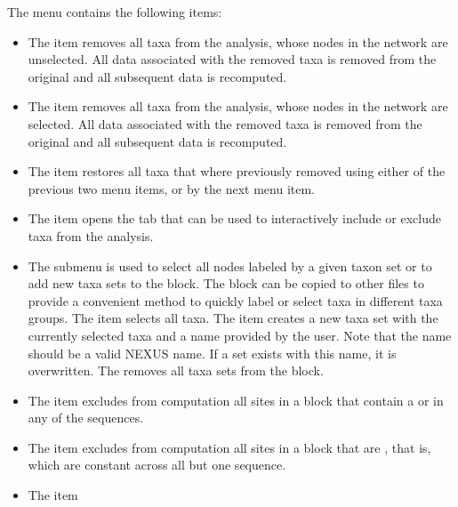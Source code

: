 \documentclass[11pt]{article}
\begin{document}

The  menu contains the following items:
\begin{itemize}
\item The  item
removes all taxa from the analysis, whose nodes in the network are
unselected.
All data associated with the removed taxa is removed
from the original  and all subsequent data is
recomputed.
\item The  item
removes all taxa from the analysis, whose nodes in the network are
selected.
All data associated with the removed taxa is removed
from the original  and all subsequent data is
recomputed.
\item The  item
restores all taxa that where previously removed using either of
the previous two menu items, or by the next menu item.
\item The  item
opens the  tab that can be used to interactively
include or exclude taxa from the analysis.
\item The  submenu is used to select all nodes
labeled by a given taxon set or to add new taxa sets to the  block. The  block can be copied to other files to provide a convenient method to quickly label or select taxa in different taxa groups.
The  item selects all taxa.
The  item creates a new taxa set with the currently selected taxa and a name provided by the user. Note that the name should be a valid NEXUS name. If a set exists with this name, it is overwritten.
The  removes all taxa sets from the  block.
\item The  item
excludes from computation all sites in a  block that contain a
 or 
in any of the sequences.
\item The  item
excludes from computation all sites in a  block that
are , that is, which are constant across all but
one sequence.
\item The  item

\end{itemize}
\end{document}
